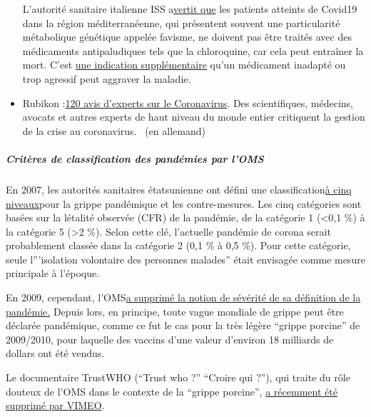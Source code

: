\begin{itemize}
  L'autorité sanitaire italienne ISS
  a\href{https://www.iss.it/en/rapporti-covid-19/-/asset_publisher/btw1J82wtYzH/content/id/5334891}{vertit
  que} les patients atteints de Covid19 dans la région méditerranéenne,
  qui présentent souvent une particularité métabolique génétique appelée
  favisme, ne doivent pas être traités avec des médicaments
  antipaludiques tels que la chloroquine, car cela peut entraîner la
  mort. C'est
  \href{https://www.sciencedaily.com/releases/2020/02/200206110703.htm}{une
  indication supplémentaire} qu'un médicament inadapté ou trop agressif
  peut aggraver la maladie.
\item
  Rubikon
  :\href{https://www.rubikon.news/artikel/120-expertenstimmen-zu-corona}{120
  avis d'experts sur le Coronavirus}. Des scientifiques, médecins,
  avocats et autres experts de haut niveau du monde entier critiquent la
  gestion de la crise au coronavirus.~ (en allemand)
\end{itemize}

\hypertarget{crituxe8res-de-classification-des-panduxe9mies-par-loms}{%
\subparagraph{\texorpdfstring{\textbf{Critères de classification des
pandémies par
l'OMS}}{Critères de classification des pandémies par l'OMS}}\label{crituxe8res-de-classification-des-panduxe9mies-par-loms}}

En 2007, les autorités sanitaires étatsunienne ont défini une
classification\href{https://www.cidrap.umn.edu/news-perspective/2007/02/hhs-ties-pandemic-mitigation-advice-severity}{à
cinq niveaux}pour la grippe pandémique et les contre-mesures. Les cinq
catégories sont basées sur la létalité observée (CFR) de la pandémie, de
la catégorie 1 (\textless{}0,1 \%) à la catégorie 5 (\textgreater{}2
\%). Selon cette clé, l'actuelle pandémie de corona serait probablement
classée dans la catégorie 2 (0,1 \% à 0,5 \%). Pour cette catégorie,
seule l'''isolation volontaire des personnes malades'' était envisagée
comme mesure principale à l'époque.

En 2009, cependant,
l'OMS\href{https://www.forbes.com/2010/02/05/world-health-organization-swine-flu-pandemic-opinions-contributors-michael-fumento.html\#5ae32fb848e8}{a
supprimé la notion de sévérité de sa définition de la pandémie.} Depuis
lors, en principe, toute vague mondiale de grippe peut être déclarée
pandémique, comme ce fut le cas pour la très légère ``grippe porcine''
de 2009/2010, pour laquelle des vaccins d'une valeur d'environ 18
milliards de dollars ont été vendus.

Le documentaire TrustWHO (``Trust who ?'' ``Croire qui ?''), qui traite
du rôle douteux de l'OMS dans le contexte de la ``grippe porcine'',
\href{https://www.youtube.com/watch?v=VjQGyqVN5RM}{a récemment été
supprimé par VIMEO}.

